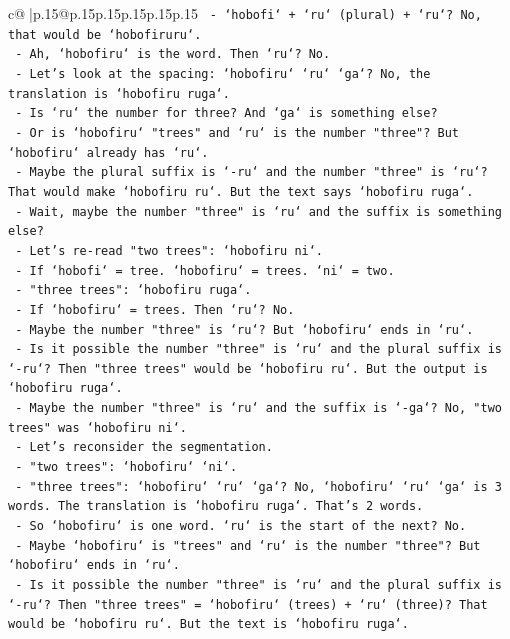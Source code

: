 \documentclass{article}
\begin{document}
{\begin{supertabular}{c@{$\;$}|p{.15\linewidth}@{}p{.15\linewidth}p{.15\linewidth}p{.15\linewidth}p{.15\linewidth}p{.15\linewidth}}
{{{\texttt{    {-} `hobofi` + `ru` (plural) + `ru`? No, that would be `hobofiruru`.} \\
\texttt{    {-} Ah, `hobofiru` is the word. Then `ru`? No.} \\
\texttt{    {-} Let's look at the spacing: `hobofiru` `ru` `ga`? No, the translation is `hobofiru ruga`.} \\
\texttt{    {-} Is `ru` the number for three? And `ga` is something else?} \\
\texttt{    {-} Or is `hobofiru` "trees" and `ru` is the number "three"? But `hobofiru` already has `ru`.} \\
\texttt{    {-} Maybe the plural suffix is `{-}ru` and the number "three" is `ru`? That would make `hobofiru ru`. But the text says `hobofiru ruga`.} \\
\texttt{    {-} Wait, maybe the number "three" is `ru` and the suffix is something else?} \\
\texttt{    {-} Let's re{-}read "two trees": `hobofiru ni`.} \\
\texttt{    {-} If `hobofi` = tree. `hobofiru` = trees. `ni` = two.} \\
\texttt{    {-} "three trees": `hobofiru ruga`.} \\
\texttt{    {-} If `hobofiru` = trees. Then `ru`? No.} \\
\texttt{    {-} Maybe the number "three" is `ru`? But `hobofiru` ends in `ru`.} \\
\texttt{    {-} Is it possible the number "three" is `ru` and the plural suffix is `{-}ru`? Then "three trees" would be `hobofiru ru`. But the output is `hobofiru ruga`.} \\
\texttt{    {-} Maybe the number "three" is `ru` and the suffix is `{-}ga`? No, "two trees" was `hobofiru ni`.} \\
\texttt{    {-} Let's reconsider the segmentation.} \\
\texttt{    {-} "two trees": `hobofiru` `ni`.} \\
\texttt{    {-} "three trees": `hobofiru` `ru` `ga`? No, `hobofiru` `ru` `ga` is 3 words. The translation is `hobofiru ruga`. That's 2 words.} \\
\texttt{    {-} So `hobofiru` is one word. `ru` is the start of the next? No.} \\
\texttt{    {-} Maybe `hobofiru` is "trees" and `ru` is the number "three"? But `hobofiru` ends in `ru`.} \\
\texttt{    {-} Is it possible the number "three" is `ru` and the plural suffix is `{-}ru`? Then "three trees" = `hobofiru` (trees) + `ru` (three)? That would be `hobofiru ru`. But the text is `hobofiru ruga`.} \\
}}}
\end{supertabular}}
\end{document}
